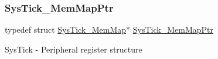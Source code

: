 \subsubsection{\texorpdfstring{Sys\+Tick\+\_\+\+Mem\+Map\+Ptr}{SysTick\_MemMapPtr}}
{\footnotesize\ttfamily typedef struct \hyperlink{struct_sys_tick___mem_map}{Sys\+Tick\+\_\+\+Mem\+Map}$\ast$ \hyperlink{group___sys_tick___peripheral_ga19e2a0c9400dcdfd462a92ca83cff253}{Sys\+Tick\+\_\+\+Mem\+Map\+Ptr}}

Sys\+Tick -\/ Peripheral register structure 